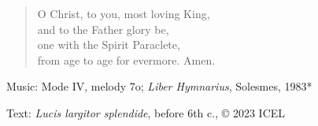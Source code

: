 \hymn



\setlength{\leftmargini}{2em}
\begin{verse}
  O Christ, to you, most loving King,\\ 
  and to the Father glory be,\\ 
  one with the Spirit Paraclete,\\
  from age to age for evermore. Amen.
\end{verse}
\setlength{\leftmargini}{\defleftmargini}

\begin{hymnsource}
Music: Mode IV, melody 7o; \emph{Liber Hymnarius}, Solesmes, 1983*

Text: \emph{Lucis largitor splendide}, before 6th c., © 2023 ICEL
\end{hymnsource}
